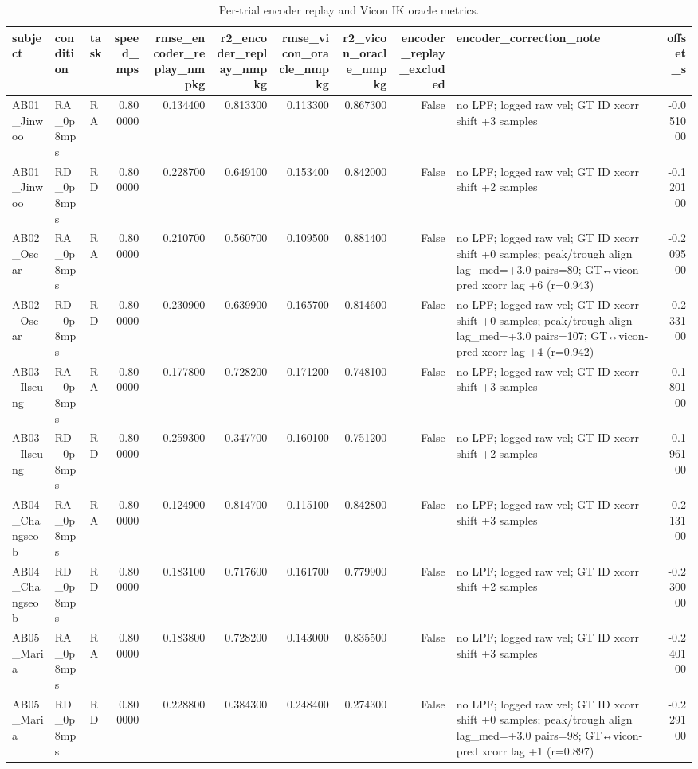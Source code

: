 \begin{table}
\caption{Per-trial encoder replay and Vicon IK oracle metrics.}
\label{tab:table2_per_trial}
\begin{tabular}{lllrrrrrrlr}
\toprule
subject & condition & task & speed\_mps & rmse\_encoder\_replay\_nmpkg & r2\_encoder\_replay\_nmpkg & rmse\_vicon\_oracle\_nmpkg & r2\_vicon\_oracle\_nmpkg & encoder\_replay\_excluded & encoder\_correction\_note & offset\_s \\
\midrule
AB01\_Jinwoo & RA\_0p8mps & RA & 0.800000 & 0.134400 & 0.813300 & 0.113300 & 0.867300 & False & no LPF; logged raw vel; GT ID xcorr shift +3 samples & -0.051000 \\
AB01\_Jinwoo & RD\_0p8mps & RD & 0.800000 & 0.228700 & 0.649100 & 0.153400 & 0.842000 & False & no LPF; logged raw vel; GT ID xcorr shift +2 samples & -0.120100 \\
AB02\_Oscar & RA\_0p8mps & RA & 0.800000 & 0.210700 & 0.560700 & 0.109500 & 0.881400 & False & no LPF; logged raw vel; GT ID xcorr shift +0 samples; peak/trough align lag\_med=+3.0 pairs=80; GT↔vicon-pred xcorr lag +6 (r=0.943) & -0.209500 \\
AB02\_Oscar & RD\_0p8mps & RD & 0.800000 & 0.230900 & 0.639900 & 0.165700 & 0.814600 & False & no LPF; logged raw vel; GT ID xcorr shift +0 samples; peak/trough align lag\_med=+3.0 pairs=107; GT↔vicon-pred xcorr lag +4 (r=0.942) & -0.233100 \\
AB03\_Ilseung & RA\_0p8mps & RA & 0.800000 & 0.177800 & 0.728200 & 0.171200 & 0.748100 & False & no LPF; logged raw vel; GT ID xcorr shift +3 samples & -0.180100 \\
AB03\_Ilseung & RD\_0p8mps & RD & 0.800000 & 0.259300 & 0.347700 & 0.160100 & 0.751200 & False & no LPF; logged raw vel; GT ID xcorr shift +2 samples & -0.196100 \\
AB04\_Changseob & RA\_0p8mps & RA & 0.800000 & 0.124900 & 0.814700 & 0.115100 & 0.842800 & False & no LPF; logged raw vel; GT ID xcorr shift +3 samples & -0.213100 \\
AB04\_Changseob & RD\_0p8mps & RD & 0.800000 & 0.183100 & 0.717600 & 0.161700 & 0.779900 & False & no LPF; logged raw vel; GT ID xcorr shift +2 samples & -0.230000 \\
AB05\_Maria & RA\_0p8mps & RA & 0.800000 & 0.183800 & 0.728200 & 0.143000 & 0.835500 & False & no LPF; logged raw vel; GT ID xcorr shift +3 samples & -0.240100 \\
AB05\_Maria & RD\_0p8mps & RD & 0.800000 & 0.228800 & 0.384300 & 0.248400 & 0.274300 & False & no LPF; logged raw vel; GT ID xcorr shift +0 samples; peak/trough align lag\_med=+3.0 pairs=98; GT↔vicon-pred xcorr lag +1 (r=0.897) & -0.229100 \\

\end{tabular}
\end{table}
